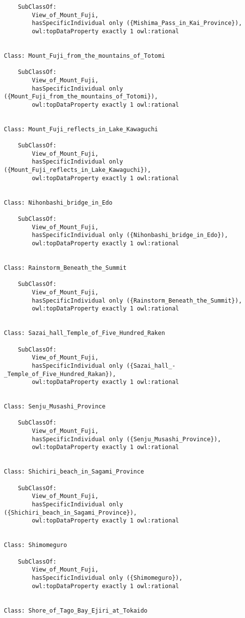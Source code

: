 \documentclass[titlepage,a4paper,12pt,oneside]{book}
\begin{document}
\begin{appendices}
\begin{lstlisting}
    SubClassOf: 
        View_of_Mount_Fuji,
        hasSpecificIndividual only ({Mishima_Pass_in_Kai_Province}),
        owl:topDataProperty exactly 1 owl:rational
    
    
Class: Mount_Fuji_from_the_mountains_of_Totomi

    SubClassOf: 
        View_of_Mount_Fuji,
        hasSpecificIndividual only ({Mount_Fuji_from_the_mountains_of_Totomi}),
        owl:topDataProperty exactly 1 owl:rational
    
    
Class: Mount_Fuji_reflects_in_Lake_Kawaguchi

    SubClassOf: 
        View_of_Mount_Fuji,
        hasSpecificIndividual only ({Mount_Fuji_reflects_in_Lake_Kawaguchi}),
        owl:topDataProperty exactly 1 owl:rational
    
    
Class: Nihonbashi_bridge_in_Edo

    SubClassOf: 
        View_of_Mount_Fuji,
        hasSpecificIndividual only ({Nihonbashi_bridge_in_Edo}),
        owl:topDataProperty exactly 1 owl:rational
    
    
Class: Rainstorm_Beneath_the_Summit

    SubClassOf: 
        View_of_Mount_Fuji,
        hasSpecificIndividual only ({Rainstorm_Beneath_the_Summit}),
        owl:topDataProperty exactly 1 owl:rational
    
    
Class: Sazai_hall_Temple_of_Five_Hundred_Raken

    SubClassOf: 
        View_of_Mount_Fuji,
        hasSpecificIndividual only ({Sazai_hall_-_Temple_of_Five_Hundred_Rakan}),
        owl:topDataProperty exactly 1 owl:rational
    
    
Class: Senju_Musashi_Province

    SubClassOf: 
        View_of_Mount_Fuji,
        hasSpecificIndividual only ({Senju_Musashi_Province}),
        owl:topDataProperty exactly 1 owl:rational
    
    
Class: Shichiri_beach_in_Sagami_Province

    SubClassOf: 
        View_of_Mount_Fuji,
        hasSpecificIndividual only ({Shichiri_beach_in_Sagami_Province}),
        owl:topDataProperty exactly 1 owl:rational
    
    
Class: Shimomeguro

    SubClassOf: 
        View_of_Mount_Fuji,
        hasSpecificIndividual only ({Shimomeguro}),
        owl:topDataProperty exactly 1 owl:rational
    
    
Class: Shore_of_Tago_Bay_Ejiri_at_Tokaido


\end{lstlisting}
\end{appendices}
\end{document}
